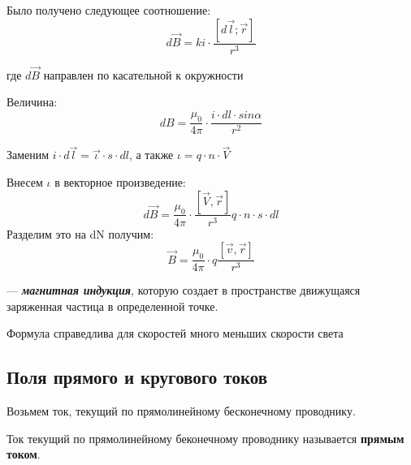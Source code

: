 \documentclass[../main.tex]{subfiles}
\begin{document}
Было получено следующее соотношение:
\[d\vec B = ki \cdot \frac{[d\vec l; \vec r]}{r^3}\]
\begin{center}
    где $d\vec B$ направлен по касательной к окружности
\end{center}
Величина:
\[dB = \frac{\mu_0}{4 \pi} \cdot \frac{i \cdot dl \cdot sin{\alpha}}{r^2}\]

Заменим $i \cdot d \vec l = \vec \iota \cdot s \cdot dl$,  а также $\iota = q \cdot n \cdot \vec V$

Внесем $\iota$ в векторное произведение:
\[d \vec B = \frac{\mu_0}{4\pi} \cdot \frac{[\vec V, \vec r]}{r^3} q \cdot n \cdot s \cdot dl\]
Разделим это на dN получим:
\[ \vec B = \frac{\mu_0}{4 \pi} \cdot q\frac{[\vec v, \vec r]}{r^3}\]
\begin{center}
    --- \textbf{\textit{магнитная индукция}}, которую создает в пространстве движущаяся заряженная частица в определенной точке. 
    
    Формула справедлива для скоростей много меньших скорости света
\end{center}

\subsection{Поля прямого и кругового токов}
Возьмем ток, текущий по прямолинейному бесконечному проводнику.

\vspace{5px}

 Ток текущий по прямолинейному беконечному проводнику называется \textbf{прямым током}. 
\end{document}
